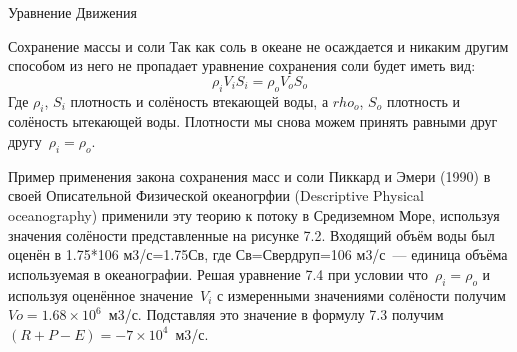 \begin{chapter}{Уравнение Движения}
\begin{section}{Сохранение массы и соли}
Так как соль в океане не осаждается и никаким другим способом из него
не пропадает уравнение сохранения соли будет иметь вид:
\begin{equation}
\rho_i V_i S_i = \rho_o V_o S_o
\end{equation}
Где $\rho_i$, $S_i$ плотность и солёность втекающей воды, а $rho_o$,
$S_o$ плотность и солёность ытекающей воды. Плотности мы снова можем
принять равными друг другу~$\rho_i = \rho_o$.
%


\begin{paragraph}{Пример применения закона сохранения масс и соли}
Пиккард и Эмери (1990) в своей Описательной Физической океаногрфии
(Descriptive Physical oceanography) применили эту теорию к потоку в
Средиземном Море, используя значения солёности представленные на
рисунке 7.2. Входящий объём воды был оценён в 1.75*106 м3/с=1.75Св,
где Св=Свердруп=106 м3/с~--- единица объёма используемая в
океанографии. Решая уравнение 7.4 при условии что~$\rho_i = \rho_o$ и
используя оценённое значение~$V_i$ с измеренными значениями солёности
получим $Vo = 1.68 \times 10^6$~м3/с. Подставляя это значение в
формулу 7.3 получим~$(R + P -E) = -7 \times 10^4$~м3/с.
%


\end{paragraph}
\end{section}
\end{chapter}
